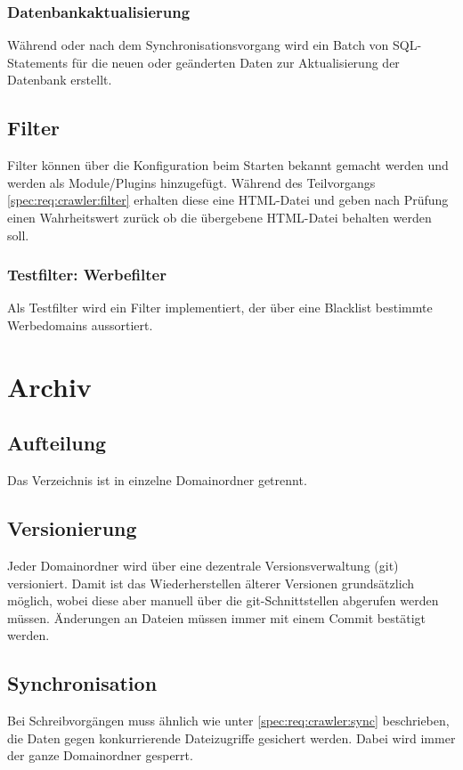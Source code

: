 	\subsubsection{Datenbankaktualisierung}
		Während oder nach dem Synchronisationsvorgang wird ein Batch von SQL-Statements für die neuen oder geänderten Daten
		zur Aktualisierung der Datenbank erstellt.
\subsection{Filter}
	Filter können über die Konfiguration beim Starten bekannt gemacht werden und werden als Module/Plugins hinzugefügt.
	Während des Teilvorgangs \ref{spec:req:crawler:filter} erhalten diese eine HTML-Datei und geben nach Prüfung einen Wahrheitswert zurück
	ob die übergebene HTML-Datei behalten werden soll.
	\subsubsection{Testfilter: Werbefilter}
		Als Testfilter wird ein Filter implementiert, der über eine Blacklist bestimmte Werbedomains aussortiert.


\section{Archiv} \label{spec:req:archive}
\subsection{Aufteilung}\label{spec:req:archive:dist}
	Das Verzeichnis ist in einzelne Domainordner getrennt. 
\subsection{Versionierung}\label{spec:req:archive:vers}
	Jeder Domainordner wird über eine dezentrale Versionsverwaltung (git) versioniert. 
	Damit ist das Wiederherstellen älterer Versionen grundsätzlich möglich,
	wobei diese aber manuell über die git-Schnittstellen abgerufen werden müssen.
	Änderungen an Dateien müssen immer mit einem Commit bestätigt werden.
\subsection{Synchronisation}\label{spec:req:archive:sync}
	Bei Schreibvorgängen muss ähnlich wie unter \ref{spec:req:crawler:sync} beschrieben, 
	die Daten gegen konkurrierende Dateizugriffe gesichert werden.
	Dabei wird immer der ganze Domainordner gesperrt.
